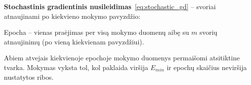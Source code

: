 \textbf{Stochastinis gradientinis nusileidimas}~\eqref{eq:stochastic_gd} – svoriai atnaujinami po kiekvieno mokymo pavyzdžio:

Epocha – vienas praėjimas per visą mokymo duomenų aibę su $m$ svorių atnaujinimų (po vieną kiekvienam pavyzdžiui).

Abiem atvejais kiekvienoje epochoje mokymo duomenys permaišomi atsitiktine tvarka. Mokymas vyksta tol, kol paklaida viršija $E_{min}$ ir epochų skaičius neviršija nustatytos ribos.